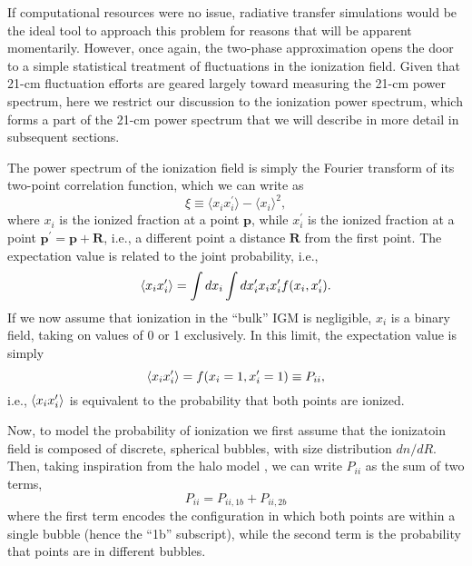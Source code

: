 If computational resources were no issue, radiative transfer simulations would be the ideal tool to approach this problem for reasons that will be apparent momentarily. However, once again, the two-phase approximation opens the door to a simple statistical treatment of fluctuations in the ionization field. Given that 21-cm fluctuation efforts are geared largely toward measuring the 21-cm power spectrum, here we restrict our discussion to the ionization power spectrum, which forms a part of the 21-cm power spectrum that we will describe in more detail in subsequent sections.

The power spectrum of the ionization field is simply the Fourier transform of its two-point correlation function, which we can write as
\begin{equation}
	\xi \equiv \langle x_i x_i^{\prime} \rangle - \langle x_i \rangle^2 ,
\end{equation}
where $x_i$ is the ionized fraction at a point $\mathbf{p}$, while $x_i^{\prime}$ is the ionized fraction at a point $\mathbf{p}^{\prime} = \mathbf{p} + \mathbf{R}$, i.e., a different point a distance $\mathbf{R}$ from the first point. The expectation value is related to the joint probability, i.e.,
\begin{equation}
	\langle x_i x_i^{\prime} \rangle = \int dx_i \int dx_i^{\prime} x_i x_i^{\prime} f(x_i, x_i^{\prime}) .
\end{equation}
If we now assume that ionization in the ``bulk'' IGM is negligible, $x_i$ is a binary field, taking on values of 0 or 1 exclusively. In this limit, the expectation value is simply
\begin{equation}
	\langle x_i x_i^{\prime} \rangle = f(x_i=1, x_i^{\prime}=1) \equiv P_{ii} ,
\end{equation}
i.e., $\langle x_i x_i^{\prime} \rangle$ is equivalent to the probability that both points are ionized. 

Now, to model the probability of ionization we first assume that the ionizatoin field is composed of discrete, spherical bubbles, with size distribution $dn/dR$. Then, taking inspiration from the halo model \cite{Cooray2002}, we can write $P_{ii}$ as the sum of two terms,
\begin{equation}
	P_{ii} = P_{ii,1b} + P_{ii,2b}
\end{equation}
where the first term encodes the configuration in which both points are within a single bubble (hence the ``1b'' subscript), while the second term is the probability that points are in different bubbles. 




